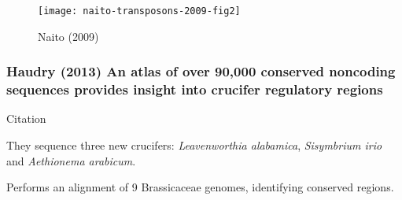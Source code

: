       \begin{figure}[!hbpt]
        \centering
        \texttt{[image: naito-transposons-2009-fig2]}
        \caption{Naito (2009) \cite{naito_unexpected_2009}}
      \end{figure}
      \FloatBarrier

    \subsubsection{Haudry (2013) An atlas of over 90,000 conserved
    noncoding sequences provides insight into crucifer regulatory regions}

      Citation \cite{haudry_atlas_2013}

      They sequence three new crucifers: \textit{Leavenworthia alabamica},
      \textit{Sisymbrium irio} and \textit{Aethionema arabicum}.

      Performs an alignment of 9 Brassicaceae genomes, identifying
      conserved regions.


